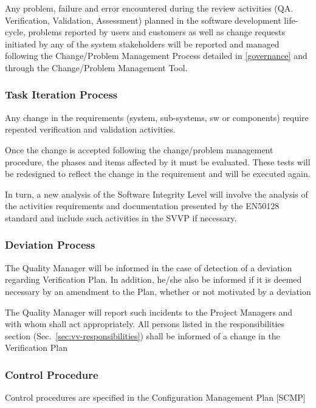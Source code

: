 \documentclass{template/openetcs_report}
\begin{document}
Any problem, failure and error encountered during the review
activities (QA. Verification, Validation, Assessment) planned in the
software development life-cycle, problems reported by users and
customers as well as change requests initiated by any of the system
stakeholders will be reported and managed following the Change/Problem
Management Process detailed in
\href{https://github.com/openETCS/governance/tree/master/Change-Problem%20Process}{[governance]} and through the Change/Problem Management Tool.

\subsubsection{Task Iteration Process}
Any change in the requirements (system, sub-systems, sw or components)
require repeated verification and validation activities. 

Once the change is accepted following the change/problem management
procedure, the phases and items affected by it must be
evaluated. These tests will be redesigned to reflect the change in the
requirement and will be executed again. 

In turn, a new analysis of the Software Integrity Level will involve
the analysis of the activities requirements and documentation
presented by the EN50128 standard and include such activities in the
SVVP if necessary. 

\subsubsection{Deviation Process}
The Quality Manager will be informed in the case of detection of a
deviation regarding Verification Plan. In addition, he/she also be
informed if it is deemed necessary by an amendment to the Plan,
whether or not motivated by a deviation 

The Quality Manager will report such incidents to the Project Managers
and with whom shall act appropriately. All persons listed in the
responsibilities section (Sec.~\ref{sec:vv-responsibilities}) shall be
informed of a change in the Verification Plan

\subsubsection{Control Procedure}
Control procedures are specified in the Configuration Management Plan [SCMP]
\end{document}
